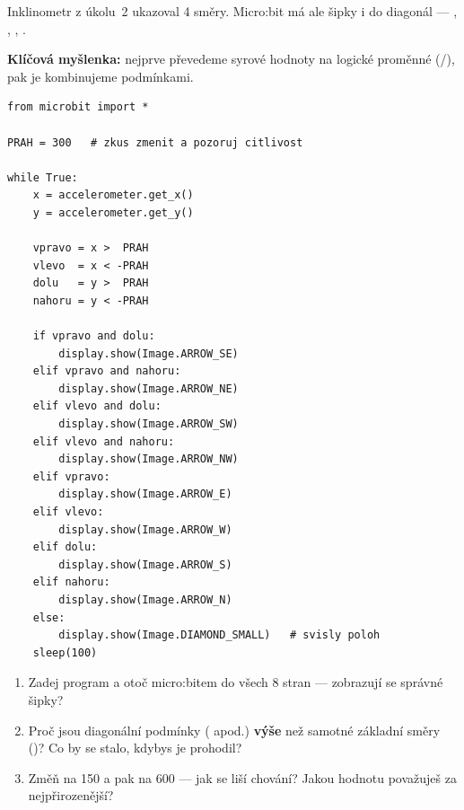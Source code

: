 \begin{bonusukol}

Inklinometr z úkolu~2 ukazoval 4 směry. Micro:bit má ale šipky i do diagonál —
, , , .

\medskip\noindent
\textbf{Klíčová myšlenka:} nejprve převedeme syrové hodnoty na logické proměnné
(/), pak je kombinujeme podmínkami.

\begin{lstlisting}
from microbit import *

PRAH = 300   # zkus zmenit a pozoruj citlivost

while True:
    x = accelerometer.get_x()
    y = accelerometer.get_y()

    vpravo = x >  PRAH
    vlevo  = x < -PRAH
    dolu   = y >  PRAH
    nahoru = y < -PRAH

    if vpravo and dolu:
        display.show(Image.ARROW_SE)
    elif vpravo and nahoru:
        display.show(Image.ARROW_NE)
    elif vlevo and dolu:
        display.show(Image.ARROW_SW)
    elif vlevo and nahoru:
        display.show(Image.ARROW_NW)
    elif vpravo:
        display.show(Image.ARROW_E)
    elif vlevo:
        display.show(Image.ARROW_W)
    elif dolu:
        display.show(Image.ARROW_S)
    elif nahoru:
        display.show(Image.ARROW_N)
    else:
        display.show(Image.DIAMOND_SMALL)   # svisly poloh
    sleep(100)
\end{lstlisting}

\begin{enumerate}
  \item Zadej program a otoč micro:bitem do všech 8 stran — zobrazují se správné šipky?
  \item Proč jsou diagonální podmínky ( apod.) \textbf{výše}
        než samotné základní směry ()?
        Co by se stalo, kdybys je prohodil?
  \item Změň  na 150 a pak na 600 — jak se liší chování?
        Jakou hodnotu považuješ za nejpřirozenější?
\end{enumerate}

\odpoved[2.5cm]

\end{bonusukol}


